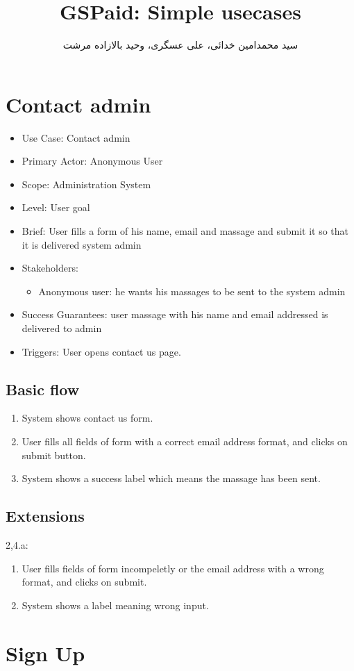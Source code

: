 \documentclass[11pt]{article}
\title{
GSPaid: Simple usecases
}
\author{سید محمد‌امین خدائی، علی عسگری، وحید بالازاده مرشت}
\begin{document}
\maketitle
\section{Contact admin}
\begin{itemize}
\item
Use Case: Contact admin
\item
Primary Actor: Anonymous User
\item
Scope: Administration System
\item
Level: User goal
\item
Brief: User fills a form of his name, email and massage and submit it so that it is delivered system admin
\item
Stakeholders:
\begin{itemize}
\item
Anonymous user: he wants his massages to be sent to the system admin
\end{itemize}
\item
Success Guarantees: user massage with his name and email addressed is delivered to admin
\item
Triggers:
User opens contact us page.
\end{itemize}
\subsection{Basic flow}
\begin{enumerate}
\item
System shows contact us form.
\item
User fills all fields of form with a correct email address format, and clicks on submit button.
\item
System shows a success label which means the massage has been sent.
\end{enumerate}
\subsection{Extensions}
2,4.a:   
\begin{enumerate}
\item
User fills fields of form incompeletly or the email address with a wrong format, and clicks on submit.
\item
System shows a label meaning wrong input.
\end{enumerate}

\section{Sign Up}
\end{document}

